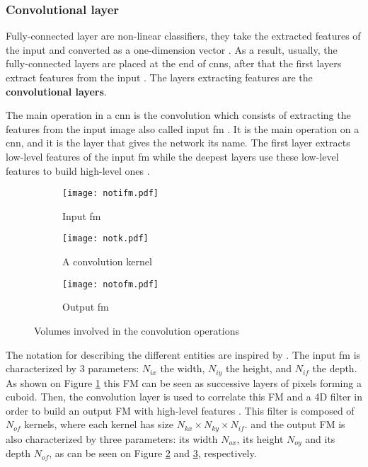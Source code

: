 \subsubsection{Convolutional layer} \label{subs:2dconv}
%
Fully-connected layer are non-linear classifiers, they take the extracted features of the input and converted as a one-dimension vector \cite{khan_survey_2020}. As a result, usually, the fully-connected layers are placed at the end of \acrshort{cnn}s, after that the first layers extract features from the input \cite{liu_fpga-based_2019}. The layers extracting features are the \textbf{convolutional layers}.

The main operation in a \acrshort{cnn} is the convolution which consists of extracting the features from the input image also called input \acrfull{fm} \cite{liu_fpga-based_2019, zhao_towards_2018}. It is the main operation on a \acrshort{cnn}, and it is the layer that gives the network its name. The first layer extracts low-level features of the input \acrshort{fm} while the deepest layers use these low-level features to build high-level ones \cite{goodfellow_deep_2016}.

\begin{figure}
    \centering
    \begin{subfigure}{.32\textwidth}
    \centering
    \texttt{[image: notifm.pdf]}
    \caption{Input \acrshort{fm}}
    \label{fig:notation:ifm}
    \end{subfigure}
    \begin{subfigure}{.32\textwidth}
    \centering
    \texttt{[image: notk.pdf]}
    \caption{A convolution kernel}
    \label{fig:notation:k}
    \end{subfigure}
    \begin{subfigure}{.32\textwidth}
    \centering
    \texttt{[image: notofm.pdf]}
    \caption{Output \acrshort{fm}}
    \label{fig:notation:ofm}
    \end{subfigure}
    \caption{Volumes involved in the convolution operations}
    \label{fig:notconv}
\end{figure}
%
The notation for describing the different entities are inspired by \cite{ma_optimizing_2018}. The input \acrshort{fm} is characterized by 3 parameters: \textbf{$N_{ix}$} the width, \textbf{$N_{iy}$} the height, and \textbf{$N_{if}$} the depth. As shown on Figure \ref{fig:notation:ifm} this FM can be seen as successive layers of pixels forming a cuboid. Then, the convolution layer is used to correlate this FM and a 4D filter in order to build an output FM with high-level features \cite{zhao_towards_2018}.
This filter is composed of $N_{of}$ kernels, where each kernel has size $N_{kx} \times N_{ky} \times N_{if}$. and the output FM is also characterized by three parameters: its width $N_{ox}$, its height $N_{oy}$ and its depth $N_{of}$, as can be seen on Figure \ref{fig:notation:k} and \ref{fig:notation:ofm}, respectively.

